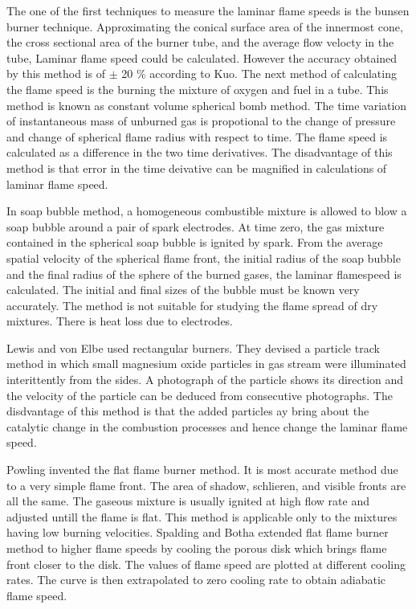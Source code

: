 \noindent The one of the first techniques to measure the laminar flame
speeds is the bunsen burner technique. Approximating the conical
surface area of the innermost cone, the cross sectional area of the
burner tube, and the average flow velocty in the tube, Laminar flame
speed could be calculated. However the accuracy obtained by this
method is of $\pm $ 20 \% according to Kuo\cite{Kuo}. The next method
of calculating the flame speed is the burning the mixture of oxygen
and fuel in a tube. This method is known as constant volume spherical
bomb method\cite{Kuo}. The time variation of instantaneous mass of
unburned gas is propotional to the change of pressure and change of
spherical flame radius with respect to time. The flame speed is
calculated as a difference in the two time derivatives. The
disadvantage of this method is that error in the time deivative can be
magnified in calculations of laminar flame speed.

\noindent In soap bubble method, a homogeneous combustible mixture is
allowed to blow a soap bubble around a pair of spark electrodes. At
time zero, the gas mixture contained in the spherical soap bubble is
ignited by spark. From the average spatial velocity of the spherical
flame front, the initial radius of the soap bubble and the final
radius of the sphere of the burned gases, the laminar flamespeed is
calculated. The initial and final sizes of the bubble must be known
very accurately. The method is not suitable for studying the flame
spread of dry mixtures. There is heat loss due to electrodes.

\noindent Lewis and von Elbe\cite{lewis} used rectangular
burners. They devised a particle track method in which small magnesium
oxide particles in gas stream were illuminated interittently from the
sides. A photograph of the particle shows its direction and the
velocity of the particle can be deduced from consecutive
photographs. The disdvantage of this method is that the added
particles ay bring about the catalytic change in the combustion
processes and hence change the laminar flame speed.

\noindent Powling\cite{powling} invented the flat flame burner
method. It is most accurate method due to a very simple flame
front. The area of shadow, schlieren, and visible fronts are all the
same. The gaseous mixture is usually ignited at high flow rate and
adjusted untill the flame is flat. This method is applicable only to
the mixtures having low burning velocities. Spalding and
Botha\cite{splading} extended flat flame burner method to higher flame
speeds by cooling the porous disk which brings flame front closer to
the disk. The values of flame speed are plotted at different cooling
rates. The curve is then extrapolated to zero cooling rate to obtain
adiabatic flame speed.

